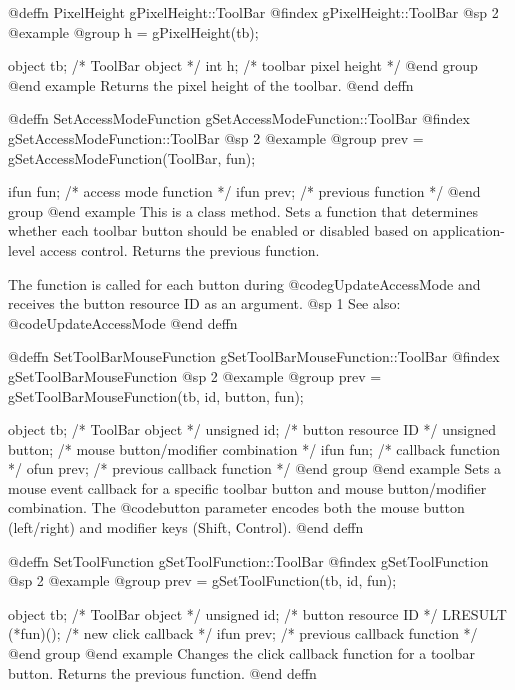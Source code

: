 @deffn {PixelHeight} gPixelHeight::ToolBar
@findex gPixelHeight::ToolBar
@sp 2
@example
@group
h = gPixelHeight(tb);

object  tb;   /*  ToolBar object         */
int     h;    /*  toolbar pixel height    */
@end group
@end example
Returns the pixel height of the toolbar.
@end deffn



@deffn {SetAccessModeFunction} gSetAccessModeFunction::ToolBar
@findex gSetAccessModeFunction::ToolBar
@sp 2
@example
@group
prev = gSetAccessModeFunction(ToolBar, fun);

ifun  fun;    /*  access mode function  */
ifun  prev;   /*  previous function     */
@end group
@end example
This is a class method.  Sets a function that determines whether each
toolbar button should be enabled or disabled based on application-level
access control.  Returns the previous function.

The function is called for each button during @code{gUpdateAccessMode}
and receives the button resource ID as an argument.
@sp 1
See also:  @code{UpdateAccessMode}
@end deffn



@deffn {SetToolBarMouseFunction} gSetToolBarMouseFunction::ToolBar
@findex gSetToolBarMouseFunction
@sp 2
@example
@group
prev = gSetToolBarMouseFunction(tb, id, button, fun);

object    tb;       /*  ToolBar object                       */
unsigned  id;       /*  button resource ID                    */
unsigned  button;   /*  mouse button/modifier combination     */
ifun      fun;      /*  callback function                     */
ofun      prev;     /*  previous callback function            */
@end group
@end example
Sets a mouse event callback for a specific toolbar button and
mouse button/modifier combination.  The @code{button} parameter
encodes both the mouse button (left/right) and modifier keys
(Shift, Control).
@end deffn



@deffn {SetToolFunction} gSetToolFunction::ToolBar
@findex gSetToolFunction
@sp 2
@example
@group
prev = gSetToolFunction(tb, id, fun);

object    tb;     /*  ToolBar object                */
unsigned  id;     /*  button resource ID             */
LRESULT   (*fun)();  /*  new click callback          */
ifun      prev;   /*  previous callback function     */
@end group
@end example
Changes the click callback function for a toolbar button.  Returns the
previous function.
@end deffn



